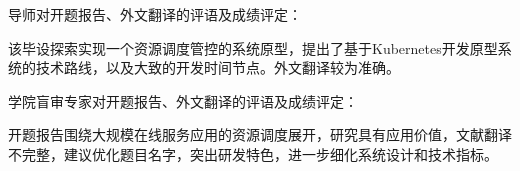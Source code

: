 
{
    \bfseries

    {
        \noindent 导师对开题报告、外文翻译的评语及成绩评定：
    }
}

该毕设探索实现一个资源调度管控的系统原型，提出了基于Kubernetes开发原型系统的技术路线，以及大致的开发时间节点。外文翻译较为准确。

{
    \bfseries
    \vspace{50mm}
    \designproposaleval[13][4]
    \signature{导师签名}

    {
        \noindent 学院盲审专家对开题报告、外文翻译的评语及成绩评定：
    }
}

开题报告围绕大规模在线服务应用的资源调度展开，研究具有应用价值，文献翻译不完整，建议优化题目名字，突出研发特色，进一步细化系统设计和技术指标。

{
    \bfseries
    \mbox{} \vfill
    \designproposaleval[12][3]
    \signature{开题报告审核负责人（签名/签章）}
}
